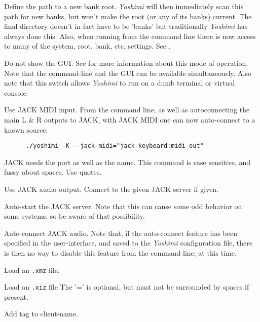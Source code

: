       Define the path to a new bank root.
      \textsl{Yoshimi} will then immediately scan this path for new banks,
      but won't make the root (or any of its banks) current. The final
      directory doesn't in fact have to be 'banks' but traditionally
      \textsl{Yoshimi} has always done this.
      Also, when running from the command line there is now access to many of
      the system, root, bank, etc. settings.
      See .

      Do not show the GUI.  See  for more
      information about this mode of operation.  Note that the command-line
      and the GUI can be available simultaneously.  Also note that this
      switch allows \textsl{Yoshimi} to run on a dumb terminal or virtual
      console.

      Use JACK MIDI input.
      From the command line, as well as autoconnecting the main L \& R
      outputs to JACK, with JACK MIDI one can now auto-connect to a known source.

   \begin{verbatim}
      ./yoshimi -K --jack-midi="jack-keyboard:midi_out"
   \end{verbatim}

   JACK needs the port as well as the name.
   This command is case sensitive, and fussy about spaces.
   Use quotes.

      Use JACK audio output.
      Connect to the given JACK server if given.

      Auto-start the JACK server.
      Note that this can cause some odd behavior on some systems, so be aware of
      that possibility.

      Auto-connect JACK audio.  Note that, if the auto-connect feature has been
      specified in the user-interface, and saved to the \textsl{Yoshimi}
      configuration file, there is then no way to disable this feature from the
      command-line, at this time.

      Load an \texttt{.xmz} file.

      Load an \texttt{.xiz} file  The '=' is optional, but must not be
      surrounded by spaces if present.

      Add tag to client-name.

